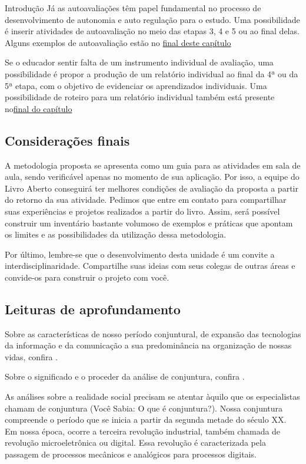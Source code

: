 \begin{apresentacao}{Introdução}
Já as autoavaliações têm papel fundamental no processo de desenvolvimento de autonomia e auto regulação para o estudo. Uma possibilidade é inserir atividades de autoavaliação no meio das etapas 3, 4 e 5 ou ao final delas. Alguns exemplos de autoavaliação estão no \hyperref[avaliacoes]{final deste capítulo}

Se o educador sentir falta de um instrumento individual de avaliação, uma possibilidade é propor a produção de um relatório individual ao final da 4ª ou da 5ª etapa, com o objetivo de evidenciar os aprendizados individuais. Uma possibilidade de roteiro para um relatório individual também está presente no\hyperref[relatorio-individual]{final do capítulo}

\subsection{Considerações finais}

A metodologia proposta se apresenta como um guia para as atividades em sala de aula, sendo verificável apenas no momento de sua aplicação. Por isso, a equipe do Livro Aberto conseguirá ter melhores condições de avaliação da proposta a partir do retorno da sua atividade. Pedimos que entre em contato para compartilhar suas experiências e projetos realizados a partir do livro. Assim, será possível construir um inventário bastante volumoso de exemplos e práticas que apontam os limites e as possibilidades da utilização dessa metodologia.

Por último, lembre-se que o desenvolvimento desta unidade é um convite a interdisciplinaridade. Compartilhe suas ideias com seus colegas de outras áreas e convide-os para construir o projeto com você.

\subsection{Leituras de aprofundamento}

Sobre as características de nosso período conjuntural, de expansão das tecnologias da informação e da comunicação a sua predominância na organização de nossas vidas, confira \citep{castells1999}.

Sobre o significado e o proceder da análise de conjuntura, confira \citep{souza2012}.

\end{apresentacao}


As análises sobre a realidade social precisam se atentar àquilo que os especialistas chamam de conjuntura (Você Sabia: O que é conjuntura?). Nossa conjuntura compreende o período que se inicia a partir da segunda metade do século XX. Em nossa época, ocorre a terceira revolução industrial, também chamada de revolução microeletrônica ou digital. Essa revolução é caracterizada pela passagem de processos mecânicos e analógicos para processos digitais.

